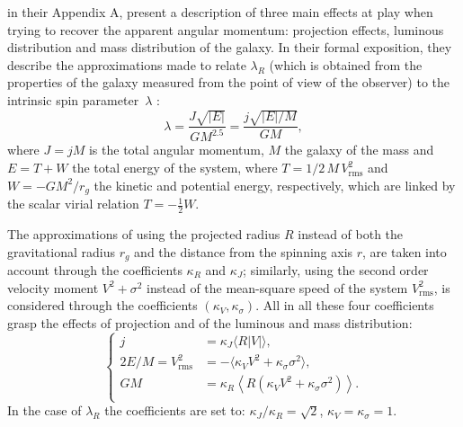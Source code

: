 

\citet{Emsellem2007} in their Appendix A, present a description of three main effects at play when trying to recover the apparent angular momentum: projection effects, luminous distribution and mass distribution of the galaxy.
In their formal exposition, they describe the approximations made to relate $\lambda_R$ (which is obtained from the properties of the galaxy measured from the point of view of the observer) to the intrinsic spin parameter~$\lambda$ \citep[p. 757]{BinneyTremaine2008}:
\begin{equation}
  \lambda = \frac{J\sqrt{|E|}}{G M^{2.5}} = \frac{j\sqrt{|E|/M}}{G M},
  \label{eq:spin_coefficient}
\end{equation}
where $J = jM$ is the total angular momentum, $M$ the galaxy of the mass and $E = T + W$ the total energy of the system, where
$T= 1/2\, M\, V^2_\mathrm{rms}$ and $W = -GM^2/r_g$ the kinetic and potential energy, respectively, which are linked by the scalar virial relation $T = -\frac 1 2 W$.

The approximations of using the projected radius $R$ instead of both the gravitational radius $r_g$ and the distance from the spinning axis $r$, are taken into account through the coefficients $\kappa_R$ and $\kappa_J$;
similarly, using the second order velocity moment $V^2+\sigma^2$ instead of the mean-square speed of the system $V^2_{\mathrm{rms}}$, is considered through the coefficients $(\kappa_V, \kappa_\sigma)$.
All in all these four coefficients grasp the effects of projection and of the luminous and mass distribution:
\begin{equation}
  \left\{
  \begin{array}{cl}
    j &= \kappa_J \langle R|V| \rangle, \\ [1ex]
    2E/M = V^2_{\mathrm{rms}} &= -\langle \kappa_V V^2 + \kappa_\sigma \sigma^2 \rangle, \\ [1ex]
    GM &= \kappa_R \left\langle R\left( \kappa_V V^2 + \kappa_\sigma \sigma^2 \right) \right\rangle. \\
  \end{array}
  \right.
  \label{eq:spin_vs_lambda_R}
\end{equation}
In the case of $\lambda_R$ the coefficients are set to: $\kappa_J/\kappa_R=\sqrt{2}$, $\kappa_V=\kappa_\sigma=1$.

